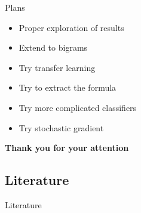 \documentclass[xcolor={table}]{beamer}
\begin{document}
\begin{frame}{Plans}
    \begin{block}{}
        \begin{itemize}   
            \item Proper exploration of results
            \item Extend to bigrams
            \item Try transfer learning
            \item Try to extract the formula
            \item Try more complicated classifiers
            \item Try stochastic gradient \cite{brand2006fast}
        \end{itemize}
    \end{block}
\end{frame} 


\begin{frame}
    \vfill
    \begin{center}
        \huge\bfseries
        Thank you for your attention
        \vfill
    \end{center}
    \vfill
\end{frame}

\appendix

        \subsection{Literature}                
            \begin{frame}[allowframebreaks]{Literature}
            \footnotesize
                \nocite{*}
                
                 
            \end{frame}
\end{document}
